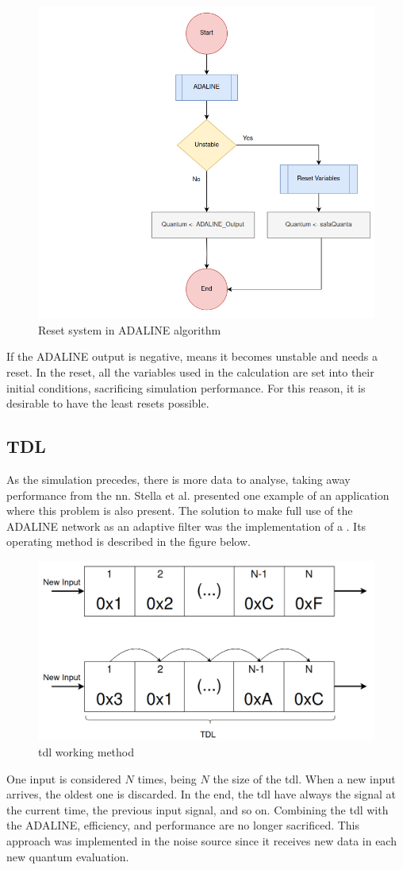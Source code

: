 \begin{figure}[H]
	\centering
 	\includegraphics[width=0.5\linewidth]{Images/ResetSystemADALINE.png}
 	\caption{Reset system in ADALINE algorithm}
	 \label{fig_ResetSystemADALINE}
\end{figure}

If the ADALINE output is negative, means it becomes unstable and needs a reset. In the reset, all the variables used in the calculation are set 
into their initial conditions, sacrificing simulation performance. For this reason, it is desirable to have the least resets possible.

\subsection{TDL}

As the simulation precedes, there is more data to analyse, taking away performance from the \gls{nn}. Stella et al. \cite{noiseCancelingADALINE} 
presented one example of an application where this problem is also present. The solution to make full use of the ADALINE network as an adaptive 
filter was the implementation of a . Its operating method is described in the figure below. 

\begin{figure}[H]
	\centering
 	\includegraphics[width=0.5\linewidth]{Images/TDL.png}
 	\caption{\gls{tdl} working method}
	 \label{fig_TDL}
\end{figure}

One input is considered $N$ times, being $N$ the size of the \gls{tdl}. When a new input arrives, the oldest one is discarded. In the end, 
the \gls{tdl} have always the signal at the current time, the previous input signal, and so on. Combining the \gls{tdl} with the ADALINE, 
efficiency, and performance are no longer sacrificed. This approach was implemented in the noise source since it receives new data in each new 
quantum evaluation. 

